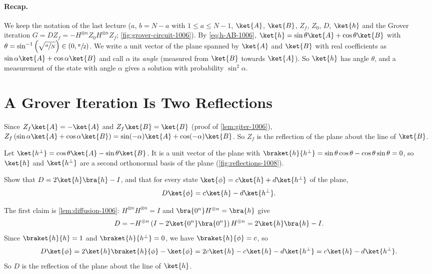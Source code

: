 
\paragraph{Recap.} We keep the notation of the last lecture ($a$, $b = N - a$ with
$1 \leq a \leq N - 1$, $\ket{A}$, $\ket{B}$, $Z_f$, $Z_0$, $D$, $\ket{h}$ and the Grover iteration
$G = D Z_f = -H^{\otimes n} Z_0 H^{\otimes n} Z_f$; \cref{fig:grover-circuit-1006}). By
\cref{eq:h-AB-1006}, $\ket{h} = \sin\theta \ket{A} + \cos\theta \ket{B}$ with
$\theta = \sin^{-1}\left(\sqrt{\sfrac{a}{N}}\right) \in (0, \sfrac{\pi}{2})$. We write a unit vector
of the plane spanned by $\ket{A}$ and $\ket{B}$ with real coefficients as
$\sin\alpha \ket{A} + \cos\alpha \ket{B}$ and call $\alpha$ its \emph{angle} (measured from $\ket{B}$
towards $\ket{A}$). So $\ket{h}$ has angle $\theta$, and a measurement of the state with angle
$\alpha$ gives a solution with probability $\sin^2\alpha$.

\section{A Grover Iteration Is Two Reflections}

Since $Z_f \ket{A} = -\ket{A}$ and $Z_f \ket{B} = \ket{B}$ (proof of \cref{lem:giter-1006}),
$Z_f \left(\sin\alpha \ket{A} + \cos\alpha \ket{B}\right) = \sin(-\alpha) \ket{A} + \cos(-\alpha) \ket{B}$.
So $Z_f$ is the reflection of the plane about the line of $\ket{B}$.

Let $\ket{h^\perp} = \cos\theta \ket{A} - \sin\theta \ket{B}$. It is a unit vector of the plane with
$\braket{h}{h^\perp} = \sin\theta\cos\theta - \cos\theta\sin\theta = 0$, so $\ket{h}$ and
$\ket{h^\perp}$ are a second orthonormal basis of the plane (\cref{fig:reflections-1008}).

\begin{exercisebox}
\begin{exercise}\label{ex:diffusion-1008}
    Show that $D = 2\ket{h}\bra{h} - I$, and that for every state
    $\ket{\phi} = c \ket{h} + d \ket{h^\perp}$ of the plane,
    \[D \ket{\phi} = c \ket{h} - d \ket{h^\perp}.\]
\end{exercise}
\tcblower
\begin{wsolution}
    The first claim is \cref{lem:diffusion-1006}: $H^{\otimes n} H^{\otimes n} = I$ and
    $\bra{0^n} H^{\otimes n} = \bra{h}$ give
    \[D = -H^{\otimes n}\left(I - 2\ket{0^n}\bra{0^n}\right)H^{\otimes n} = 2\ket{h}\bra{h} - I.\]
    Since $\braket{h}{h} = 1$ and $\braket{h}{h^\perp} = 0$, we have $\braket{h}{\phi} = c$, so
    \[D\ket{\phi} = 2\ket{h}\braket{h}{\phi} - \ket{\phi} = 2c\ket{h} - c\ket{h} - d\ket{h^\perp}
        = c\ket{h} - d\ket{h^\perp}.\]
    So $D$ is the reflection of the plane about the line of $\ket{h}$.
\end{wsolution}
\end{exercisebox}

